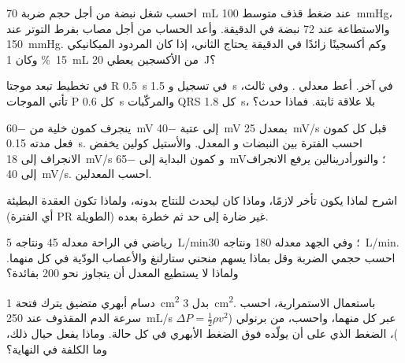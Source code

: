 \begin{exercise}[$\star\star$]\label{exo:b2:heart:6}
احسب شغل نبضة من أجل حجم ضربة \qty{70}{mL} عند
ضغط قذف متوسط \qty{100}{mmHg}، والاستطاعة عند 72 نبضة
في الدقيقة. وأعد الحساب من أجل مصاب بفرط التوتر عند \qty{150}{mmHg}. وكم
أكسجينًا زائدًا في الدقيقة يحتاج  الثاني، إذا كان
المردود الميكانيكي \qty{15}{\%} وكان \qty{1}{mL} من الأكسجين
يعطي \qty{20}{J}؟
\end{exercise}

\begin{exercise}[$\star\star$]\label{exo:b2:heart:7}
في تخطيط  تبعد موجتا R \qty{0.5}{s} في تسجيل و
\qty{1.5}{s} في آخر. أعط معدلي . وفي ثالث، تأتي الموجات P
كل \qty{0.6}{s} والمركّبات QRS كل \qty{1.8}{s}، بلا
علاقة ثابتة. فماذا حدث؟
\end{exercise}

\begin{exercise}[$\star\star$]\label{exo:b2:heart:8}
ينجرف كمون خلية  من \qty{-60}{mV} إلى
عتبة \qty{-40}{mV} بمعدل \qty{25}{mV/s} قبل كل كمون
فعل مدته \qty{0.15}{s}. احسب الفترة بين النبضات و
المعدل. والأستيل كولين يخفض الانجراف إلى \qty{18}{mV/s} و
كمون البداية إلى \qty{-65}{mV}؛ والنورأدرينالين يرفع الانجراف
إلى \qty{40}{mV/s}. احسب المعدلين.
\end{exercise}

\begin{exercise}[$\star\star$]\label{exo:b2:heart:9}
اشرح لماذا يكون تأخر  لازمًا، وماذا كان ليحدث
للنتاج بدونه، ولماذا تكون العقدة البطيئة (أي الفترة PR الطويلة)
غير ضارة إلى حد ثم خطرة بعده.
\end{exercise}

\begin{exercise}[$\star\star\star$]\label{exo:b2:heart:10}
رياضي في الراحة معدله 45 ونتاجه \qty{5}{L/min}؛
وفي الجهد معدله 180 ونتاجه \qty{30}{L/min}. احسب حجمي
الضربة وقل بماذا يسهم منحني ستارلنغ والأعصاب الودّية
في كل منهما. ولماذا لا يستطيع المعدل أن يتجاوز نحو 200 بفائدة؟
\end{exercise}

\begin{exercise}[$\star\star\star$]\label{exo:b2:heart:11}
دسام أبهري متضيق يترك فتحة \qty{1}{cm^2} بدل
\qty{3}{cm^2}. باستعمال الاستمرارية، احسب سرعة الدم
المقذوف عند \qty{250}{mL/s} عبر كل منهما، واحسب، من برنولي
($\Delta P = \tfrac12\rho v^2$)، الضغط الذي على  أن
يولّده فوق الضغط الأبهري في كل حالة. وماذا يفعل
 حيال ذلك، وما الكلفة في النهاية؟
\end{exercise}

